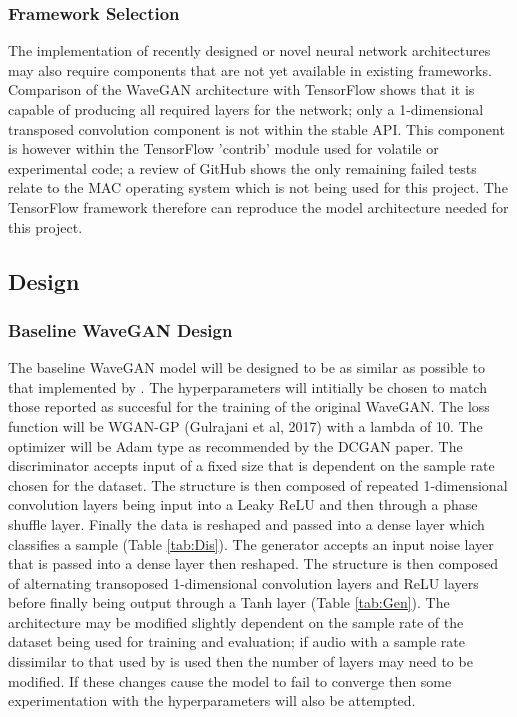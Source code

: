 \documentclass[a4paper, dvipsnames, titlepage]{article}
\begin{document}
\subsubsection{Framework Selection}

The implementation of recently designed or novel neural network architectures may also require components that are not yet available in existing frameworks.
Comparison of the WaveGAN architecture with TensorFlow shows that it is capable of producing all required layers for the network; only a 1-dimensional transposed convolution component is not within the stable API.
\newline
\newline
This component is however within the TensorFlow 'contrib' module used for volatile or experimental code; a review of GitHub shows the only remaining failed tests relate to the MAC operating system which is not being used for this project.
The TensorFlow framework therefore can reproduce the model architecture needed for this project.

\subsection{Design}



\subsubsection{Baseline WaveGAN Design}

The baseline WaveGAN model will be designed to be as similar as possible to that implemented by \citeauthor{2018arXiv180204208D}.
The hyperparameters will intitially be chosen to match those reported as succesful for the training of the original WaveGAN.
The loss function will be WGAN-GP (Gulrajani et al, 2017) with a lambda of 10.
The optimizer will be Adam type as recommended by the DCGAN paper.
\newline
\newline
The discriminator accepts input of a fixed size that is dependent on the sample rate chosen for the dataset.
The structure is then composed of repeated 1-dimensional convolution layers being input into a Leaky ReLU and then through a phase shuffle layer.
Finally the data is reshaped and passed into a dense layer which classifies a sample (Table \ref{tab:Dis}).
\newline
\newline
The generator accepts an input noise layer that is passed into a dense layer then reshaped.
The structure is then composed of alternating transoposed 1-dimensional convolution layers and ReLU layers before finally being output through a Tanh layer (Table \ref{tab:Gen}).
\newline
\newline
The architecture may be modified slightly dependent on the sample rate of the dataset being used for training and evaluation; if audio with a sample rate dissimilar to that used by \citeauthor{2018arXiv180204208D} is used then the number of layers may need to be modified.
If these changes cause the model to fail to converge then some experimentation with the hyperparameters will also be attempted.
\end{document}
